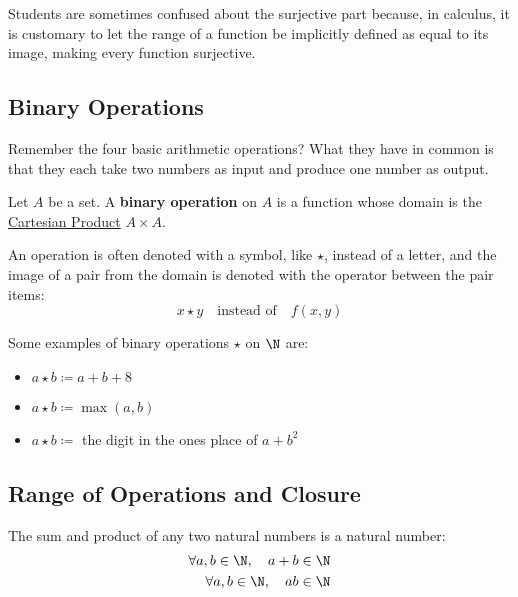\begin{note}
    Students are sometimes confused about the surjective part because, in calculus, it is customary to let the range of a function be implicitly defined as equal to its image, making every function surjective.
\end{note}

\subsection{Binary Operations}

Remember the four basic arithmetic operations? What they have in common is that they each take two numbers as input and produce one number as output.

\begin{definition}\label{def:binary-operation}
    Let $A$ be a set. A \textbf{binary operation} on $A$ is a function whose domain is the \hyperref[def:cartesian-product]{Cartesian Product} $A \times A$.
\end{definition}

\begin{notation}
    An operation is often denoted with a symbol, like $\star$, instead of a letter, and the image of a pair from the domain is denoted with the operator between the pair items:
    \[
        x \star y \quad \text{instead of} \quad f(x,y)
    \]
\end{notation}

\begin{eg}
    Some examples of binary operations $\star$ on $\N$ are:
    \begin{itemize}
        \item $a \star b \coloneqq a + b + 8$
        \item $a \star b \coloneqq \max(a,b)$
        \item $a \star b \coloneqq$ the digit in the ones place of $a + b^2$
    \end{itemize}
\end{eg}

\subsection{Range of Operations and Closure}

The sum and product of any two natural numbers is a natural number:
\begin{align*}
    \forall a,b \in \N, \quad a + b &\in \N \\
    \forall a,b \in \N, \quad ab &\in \N
\end{align*}

